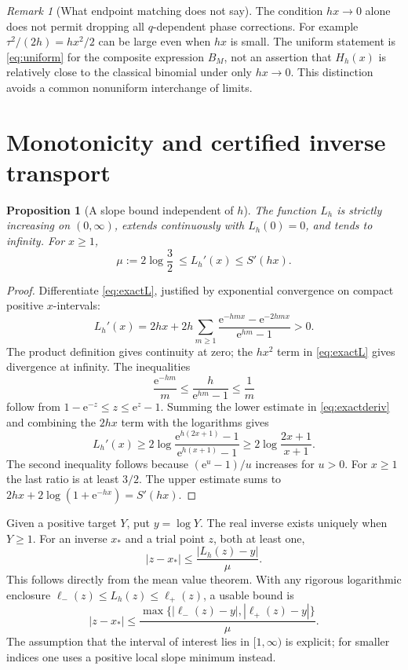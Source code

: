 \documentclass[11pt,a4paper]{article}
\newcommand{\ee}{\mathrm e}
\numberwithin{equation}{section}
\theoremstyle{plain}
\newtheorem{proposition}[theorem]{Proposition}
\theoremstyle{definition}
\theoremstyle{remark}
\newtheorem{remark}[theorem]{Remark}
\begin{document}
\begin{remark}[What endpoint matching does not say]
The condition $hx\to0$ alone does not permit dropping all $q$-dependent
phase corrections. For example $\tau^2/(2h)=hx^2/2$ can be large even when
$hx$ is small. The uniform statement is \eqref{eq:uniform} for the composite
expression $B_M$, not an assertion that $H_h(x)$ is relatively close to the
classical binomial under only $hx\to0$. This distinction avoids a common
nonuniform interchange of limits.
\end{remark}

\section{Monotonicity and certified inverse transport}
\label{sec:inversecert}

\begin{proposition}[A slope bound independent of $h$]
\label{prop:slope}
The function $L_h$ is strictly increasing on $(0,\infty)$, extends
continuously with $L_h(0)=0$, and tends to infinity. For $x\ge1$,
\begin{equation}
 \mu:=2\log\frac32\ \le L_h'(x)\le S'(hx).
 \label{eq:slopebounds}
\end{equation}
\end{proposition}
\begin{proof}
Differentiate \eqref{eq:exactL}, justified by exponential convergence on
compact positive $x$-intervals:
\begin{equation}
 L_h'(x)=2hx+2h\sum_{m\ge1}
       \frac{\ee^{-hmx}-\ee^{-2hmx}}{\ee^{hm}-1}>0.
 \label{eq:exactderiv}
\end{equation}
The product definition gives continuity at zero; the $hx^2$ term in
\eqref{eq:exactL} gives divergence at infinity. The inequalities
\[
 \frac{\ee^{-hm}}m\le\frac h{\ee^{hm}-1}\le\frac1m
\]
follow from $1-\ee^{-z}\le z\le\ee^z-1$. Summing the lower estimate in
\eqref{eq:exactderiv} and combining the $2hx$ term with the logarithms gives
\[
 L_h'(x)\ge2\log\frac{\ee^{h(2x+1)}-1}{\ee^{h(x+1)}-1}
 \ge2\log\frac{2x+1}{x+1}.
\]
The second inequality follows because $(\ee^u-1)/u$ increases for $u>0$.
For $x\ge1$ the last ratio is at least $3/2$. The upper estimate sums to
$2hx+2\log(1+\ee^{-hx})=S'(hx)$.
\end{proof}

Given a positive target $Y$, put $y=\log Y$. The real inverse exists uniquely
when $Y\ge1$. For an inverse $x_*$ and a trial point $z$, both at least one,
\begin{equation}
 |z-x_*|\le\frac{|L_h(z)-y|}{\mu}.
 \label{eq:residual}
\end{equation}
This follows directly from the mean value theorem. With any rigorous
logarithmic enclosure $\ell_-(z)\le L_h(z)\le\ell_+(z)$, a usable bound is
\begin{equation}
 |z-x_*|\le\frac{\max\{|\ell_-(z)-y|,|\ell_+(z)-y|\}}{\mu}.
 \label{eq:intervaltransport}
\end{equation}
The assumption that the interval of interest lies in $[1,\infty)$ is explicit;
for smaller indices one uses a positive local slope minimum instead.
\end{document}
